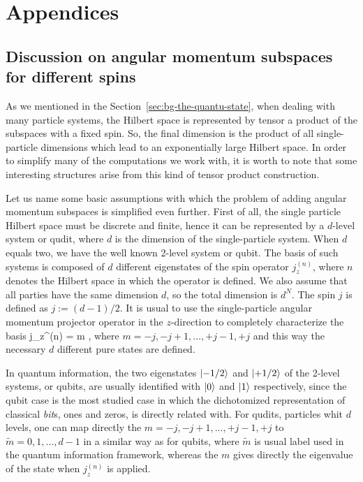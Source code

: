 \renewcommand\thesubsection{\Alph{subsection}}
\section*{Appendices}

\subsection{Discussion on angular momentum subspaces for different spins}
\label{app:angular-subspaces}

As we mentioned in the Section~\ref{sec:bg-the-quantu-state}, when dealing with many particle systems, the Hilbert space is represented by tensor a product of the subspaces with a fixed spin.
So, the final dimension is the product of all single-particle dimensions which lead to an exponentially large Hilbert space.
In order to simplify many of the computations we work with, it is worth to note that some interesting structures arise from this kind of tensor product construction.

Let us name some basic assumptions with which the problem of adding angular momentum subspaces is simplified even further.
First of all, the single particle Hilbert space must be discrete and finite, hence it can be represented by a $d$-level system or qudit, where $d$ is the dimension of the single-particle system.
When $d$ equals two, we have the well known 2-level system or qubit.
The basis of such systems is composed of $d$ different eigenstates of the spin operator $j_z^{(n)}$, where $n$ denotes the Hilbert space in which the operator is defined.
We also assume that all parties have the same dimension $d$, so the total dimension is $d^N$.
The spin $j$ is defined as $j:=(d-1)/2$.
It is usual to use the single-particle angular momentum projector operator in the $z$-direction to completely characterize the basis
\be
  j_z^{(n)} = m ,
\ee
where $m = -j,-j+1,\dots,+j-1,+j$ and this way the necessary $d$ different pure states are defined.

In quantum information, the two eigenstates $\vert{-1/2}\rangle$ and $\vert{+1/2}\rangle$ of the 2-level systems, or qubits, are usually identified with $\vert{0}\rangle$ and $\vert{1}\rangle$ respectively, since the qubit case is the most studied case in which the dichotomized representation of classical \emph{bit}s, ones and zeros, is directly related with.
For qudits, particles whit $d$ levels, one can map directly the $m=-j,-j+1,\dots,+j-1,+j$ to $\tilde{m}=0,1,\dots,d-1$ in a similar way as for qubits, where $\tilde{m}$ is usual label used in the quantum information framework, whereas the $m$ gives directly the eigenvalue of the state when $j_z^{(n)}$ is applied.

